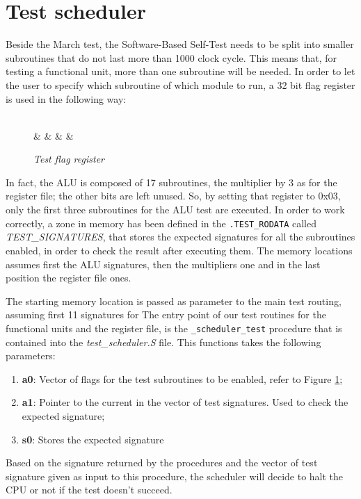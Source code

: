 \documentclass[paper=a4, fontsize=10pt]{scrartcl}	%
\begin{document}
	\section{Test scheduler}
	Beside the March test, the Software-Based Self-Test needs to be split into smaller subroutines that do not last more than 1000 clock cycle. This means that, for testing a functional unit, more than one subroutine will be needed. In order to let the user to specify which subroutine of which module to run, a 32 bit flag register is used in the following way:
	\begin{figure}[ht]
		\begin{center}
			\begin{bytefield}[endianness=big,bitwidth=0.03\linewidth]{32}
				 \\
				 &  &  &   & \\
			\end{bytefield}
		\end{center}
		\caption{\textit{Test flag register}}
		\label{fig:test_flag}
	\end{figure}\newline
	In fact, the ALU is composed of 17 subroutines, the multiplier by 3 as for the register file; the other bits are left unused. So, by setting that register to 0x03, only the first three subroutines for the ALU test are executed.\newline\newline
	In order to work correctly, a zone in memory has been defined in the \texttt{.TEST\_RODATA} called \textit{TEST\_SIGNATURES}, that stores the expected signatures for all the subroutines enabled, in order to check the result after executing them. The memory locations assumes first the ALU signatures, then the multipliers one and in the last position the register file ones.
	
	The starting memory location is passed as parameter to the main test routing, assuming first 11 signatures for 
	The entry point of our test routines for the functional units and the register file, is the \texttt{\_scheduler\_test} procedure that is contained into the \textit{test\_scheduler.S} file. This functions takes the following parameters:
	\begin{enumerate}
		\itemsep0sp
		\item \textbf{a0}: Vector of flags for the test subroutines to be enabled, refer to Figure \ref{fig:test_flag};
		\item \textbf{a1}: Pointer to the current in the vector of test signatures. Used to check the expected signature;
		\item \textbf{s0}: Stores the expected signature 
	\end{enumerate}
	Based on the signature returned by the procedures and the vector of test signature given as input to this procedure, the scheduler will decide to halt the CPU or not if the test doesn't succeed.
	
\end{document}
